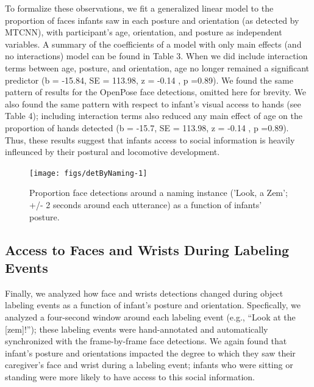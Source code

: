 \documentclass[10pt, letterpaper]{article}
\newenvironment{CodeChunk}{}{}
\begin{document}
To formalize these observations, we fit a generalized linear model to
the proportion of faces infants saw in each posture and orientation (as
detected by MTCNN), with participant's age, orientation, and posture as
independent variables. A summary of the coefficients of a model with
only main effects (and no interactions) model can be found in Table 3.
When we did include interaction terms between age, posture, and
orientation, age no longer remained a significant predictor (b = -15.84,
SE = 113.98, z = -0.14 , p =0.89). We found the same pattern of results
for the OpenPose face detections, omitted here for brevity. We also
found the same pattern with respect to infant's visual access to hands
(see Table 4); including interaction terms also reduced any main effect
of age on the proportion of hands detected (b = -15.7, SE = 113.98, z =
-0.14 , p =0.89). Thus, these results suggest that infants access to
social information is heavily infleunced by their postural and
locomotive development.

\begin{CodeChunk}
\begin{figure}[H]

{\centering \texttt{[image: figs/detByNaming-1]} 

}

\caption[Proportion face detections around a naming instance ('Look, a Zem']{Proportion face detections around a naming instance ('Look, a Zem'; +/- 2 seconds around each utterance) as a function of infants' posture.}\label{fig:detByNaming}
\end{figure}
\end{CodeChunk}

\subsection{Access to Faces and Wrists During Labeling
Events}\label{access-to-faces-and-wrists-during-labeling-events}

Finally, we analyzed how face and wrists detections changed during
object labeling events as a function of infant's posture and
orientation. Specfically, we analyzed a four-second window around each
labeling event (e.g., ``Look at the {[}zem{]}!''); these labeling events
were hand-annotated and automatically synchronized with the
frame-by-frame face detections. We again found that infant's posture and
orientations impacted the degree to which they saw their caregiver's
face and wrist during a labeling event; infants who were sitting or
standing were more likely to have access to this social information.
\end{document}
